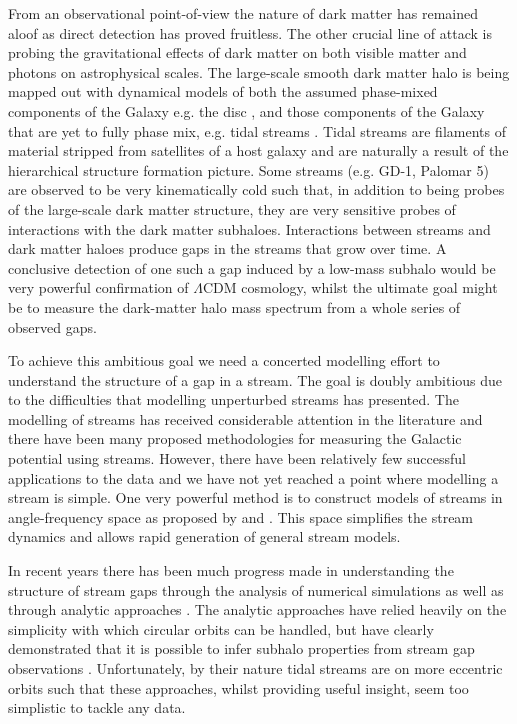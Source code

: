 \documentclass[useAMS,usenatbib,fleqn,a4paper]{mn2e}
\begin{document}
From an observational point-of-view the nature of dark matter has remained aloof as direct detection has proved fruitless. The other crucial line of attack is probing the gravitational effects of dark matter on both visible matter and photons on astrophysical scales. The large-scale smooth dark matter halo is being mapped out with dynamical models of both the assumed phase-mixed components of the Galaxy e.g. the disc \citep{BovyRix2013, Piffl2014}, and those components of the Galaxy that are yet to fully phase mix, e.g. tidal streams \cite{Koposov2010}. Tidal streams are filaments of material stripped from satellites of a host galaxy and are naturally a result of the hierarchical structure formation picture. Some streams (e.g. GD-1, Palomar 5) are observed to be very kinematically cold such that, in addition to being probes of the large-scale dark matter structure, they are very sensitive probes of interactions with the dark matter subhaloes. Interactions between streams and dark matter haloes produce gaps in the streams that grow over time. A conclusive detection of one such a gap induced by a low-mass subhalo would be very powerful confirmation of $\Lambda$CDM cosmology, whilst the ultimate goal might be to measure the dark-matter halo mass spectrum from a whole series of observed gaps.

To achieve this ambitious goal we need a concerted modelling effort to understand the structure of a gap in a stream. The goal is doubly ambitious due to the difficulties that modelling unperturbed streams has presented. The modelling of streams has received considerable attention in the literature and there have been many proposed methodologies for measuring the Galactic potential using streams. However, there have been relatively few successful applications to the data \citep{Koposov2010,LawMajewski2010,Gibbons2014,Kuepper2015,Bowden2015} and we have not yet reached a point where modelling a stream is simple. One very powerful method is to construct models of streams in angle-frequency space as proposed by \cite{Bovy2014} and \cite{Sanders2014}. This space simplifies the stream dynamics \citep{HelmiWhite1999,Tremaine1999} and allows rapid generation of general stream models.

In recent years there has been much progress made in understanding the structure of stream gaps through the analysis of numerical simulations \citep{SiegalGaskins2008,Carlberg2009,YoonJohnstonHogg,Carlberg2012} as well as through analytic approaches \citep{Carlberg2013,ErkalBelokurov2015,ErkalBelokurov2015b}. The analytic approaches have relied heavily on the simplicity with which circular orbits can be handled, but have clearly demonstrated that it is possible to infer subhalo properties from stream gap observations \citep{ErkalBelokurov2015b}. Unfortunately, by their nature tidal streams are on more eccentric orbits such that these approaches, whilst providing useful insight, seem too simplistic to tackle any data.
\end{document}
